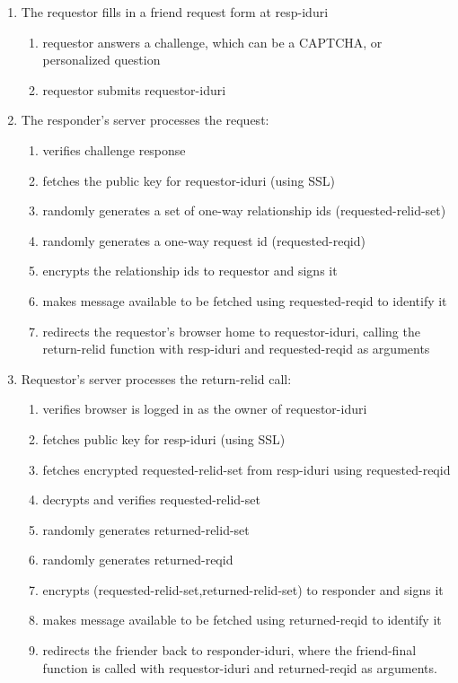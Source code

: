 \documentclass[letterpaper,11pt,oneside]{article}
\begin{document}
\begin{enumerate}
\item The requestor fills in a friend request form at resp-iduri
    \begin{enumerate}
    \item requestor answers a challenge, which can be a CAPTCHA, or 
            personalized question
    \item requestor submits requestor-iduri
    \end{enumerate}

\item The responder's server processes the request:
    \begin{enumerate}
    \item verifies challenge response
    \item fetches the public key for requestor-iduri (using SSL)
    \item randomly generates a set of one-way relationship ids (requested-relid-set)
    \item randomly generates a one-way request id (requested-reqid)
    \item encrypts the relationship ids to requestor and signs it
    \item makes message available to be fetched using requested-reqid to identify it
    \item redirects the requestor's browser home to requestor-iduri, calling the return-relid 
        function with resp-iduri and requested-reqid as arguments
    \end{enumerate}

\item Requestor's server processes the return-relid call:
    \begin{enumerate}
    \item verifies browser is logged in as the owner of requestor-iduri
    \item fetches public key for resp-iduri (using SSL)
    \item fetches encrypted requested-relid-set from resp-iduri using requested-reqid
    \item decrypts and verifies requested-relid-set
    \item randomly generates returned-relid-set
    \item randomly generates returned-reqid
    \item encrypts (requested-relid-set,returned-relid-set) to responder and signs it
    \item makes message available to be fetched using returned-reqid to identify it
    \item redirects the friender back to responder-iduri, where the friend-final function is called
    with requestor-iduri and returned-reqid as arguments.
    \end{enumerate}


\end{enumerate}
\end{document}
